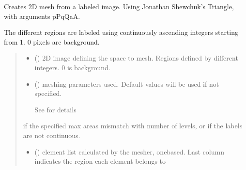\documentclass[letterpaper,10pt,english]{sphinxmanual}
\begin{document}
\begin{fulllineitems}
\label{\detokenize{_autosummary/nirfasterff.meshing.meshutils.img2mesh:nirfasterff.meshing.meshutils.img2mesh}}
\pysigstartsignatures
{}
\pysigstopsignatures
\sphinxAtStartPar
Creates 2D mesh from a labeled image. Using Jonathan Shewchuk’s Triangle, with arguments \sphinxhyphen{}pPqQaA.

\sphinxAtStartPar
The different regions are labeled using continuously ascending integers starting from 1. 0 pixels are background.
\begin{quote}\begin{description}
\begin{itemize}
\item {} 
\sphinxAtStartPar
{} () \textendash{} 2D image defining the space to mesh. Regions defined by different integers. 0 is background.

\item {} 
\sphinxAtStartPar
{} ({\hyperref[\detokenize{_autosummary/nirfasterff.utils.MeshingParams:nirfasterff.utils.MeshingParams}]{}}\sphinxstyleliteralemphasis{\sphinxupquote{, }}) \textendash{} 
\sphinxAtStartPar
meshing parameters used. Default values will be used if not specified.

\sphinxAtStartPar
See {\hyperref[\detokenize{_autosummary/nirfasterff.utils.MeshingParams2D:nirfasterff.utils.MeshingParams2D}]{}} for details


\end{itemize}

\sphinxAtStartPar
{} \textendash{} if the specified max areas mismatch with number of levels, or if the labels are not continuous.

\sphinxAtStartPar
\begin{itemize}
\item {} 
\sphinxAtStartPar
{} () \textendash{} element list calculated by the mesher, one\sphinxhyphen{}based. Last column indicates the region each element belongs to


\end{itemize}
\end{description}
\end{quote}
\end{fulllineitems}
\end{document}
